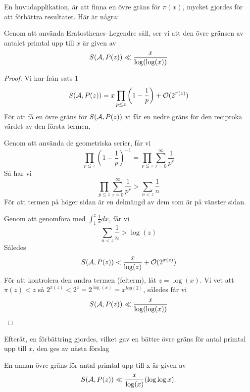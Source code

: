 En huvudapplikation, är att finna en övre gräns för $ \pi(x) $, mycket gjordes för att förbättra resultatet. Här är några:
\begin{proposition}
    Genom att använda Eratosthenes–Legendre såll, ser vi att den övre gränsen av antalet primtal upp till $ x $ är given av
\[S(\mathcal{A}, P(z))\ll\frac{x}{\log(\log(x))}\]
\end{proposition}
\begin{proof}
Vi har från sats 1
\[S(\mathcal{A}, P(z))=x \prod_{p\leq z}\left( 1-\frac{1}{p} \right) +\mathcal{O}(2^{\pi(z)})\]
För att få en övre gräns för $ S(\mathcal{A}, P(z)) $ vi får en nedre gräns för den reciproka värdet av den första termen, 

Genom att använda de geometriska serier, får vi
\[\prod_{p\leq z}\left( 1-\frac{1}{p} \right)^{-1}=\prod_{p\leq z}\sum_{r=0}^{\infty}\frac{1}{p^{r}}\]
Så har vi
\[\prod_{p\leq z}\sum_{r=0}^{\infty}\frac{1}{p^{r}}>\sum_{n<z}\frac{1}{n}\]
För att termen på höger sidan är en delmängd av dem som är på vänster sidan.

Genom att genomföra med $ \int_{1}^{z}\frac{1}{x}dx $, får vi
\[\sum_{n<z}\frac{1}{n}>\log(z)\]
Således
\[S(\mathcal{A}, P(z))<\frac{x}{\log(z)}+\mathcal{O}(2^{\pi(z)})\]
För att kontrolera den andra termen (felterm), låt $ z=\log(x)$. Vi vet att $ \pi(z)<z $ så $ 2^{\pi(z)}<2^{z}=2^{\log(x)}=x^{log(2)} $, således får vi
\[S(\mathcal{A}, P(z))\ll\frac{x}{\log(\log(x))}\]
\end{proof}
Efteråt, en förbättring gjordes, vilket gav en bättre övre gräns för antal primtal upp till $ x $, den ges av nästa förslag
\begin{proposition}
En annan övre gräns för antal primtal upp till x är given av
\[S(\mathcal{A}, P(z))\ll\frac{x}{\log(x)}(\log\log x).\]
\end{proposition}

